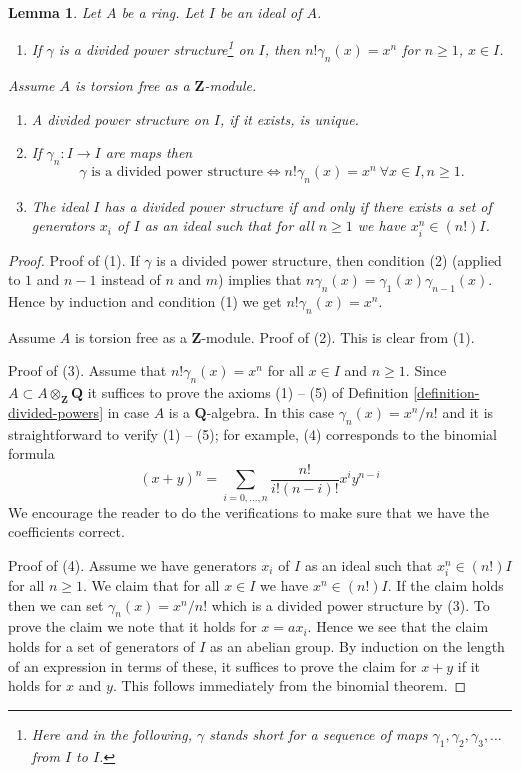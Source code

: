 \documentclass{stacks-project}
\theoremstyle{plain}
\newtheorem{lemma}[subsection]{Lemma}
\theoremstyle{definition}
\theoremstyle{remark}
\numberwithin{equation}{subsection}
\begin{document}
\begin{lemma}
\label{lemma-silly}
Let $A$ be a ring. Let $I$ be an ideal of $A$.
\begin{enumerate}
\item If $\gamma$ is a divided power structure\footnote{Here
and in the following, $\gamma$ stands short for a sequence
of maps $\gamma_1, \gamma_2, \gamma_3, \ldots$ from $I$ to $I$.}
on $I$, then
$n! \gamma_n(x) = x^n$ for $n \geq 1$, $x \in I$.
\end{enumerate}
Assume $A$ is torsion free as a $\mathbf{Z}$-module.
\begin{enumerate}
\item[(2)] A divided power structure on $I$, if it exists, is unique.
\item[(3)] If $\gamma_n : I \to I$ are maps then
$$
\gamma\text{ is a divided power structure}
\Leftrightarrow
n! \gamma_n(x) = x^n\ \forall x \in I, n \geq 1.
$$
\item[(4)] The ideal $I$ has a divided power structure
if and only if there exists
a set of generators $x_i$ of $I$ as an ideal such that
for all $n \geq 1$ we have $x_i^n \in (n!)I$.
\end{enumerate}
\end{lemma}

\begin{proof}
Proof of (1). If $\gamma$ is a divided power structure, then condition
(2) (applied to $1$ and $n-1$ instead of $n$ and $m$)
implies that $n \gamma_n(x) = \gamma_1(x)\gamma_{n - 1}(x)$. Hence
by induction and condition (1) we get $n! \gamma_n(x) = x^n$.

\medskip\noindent
Assume $A$ is torsion free as a $\mathbf{Z}$-module.
Proof of (2). This is clear from (1).

\medskip\noindent
Proof of (3). Assume that $n! \gamma_n(x) = x^n$ for all $x \in I$ and
$n \geq 1$. Since $A \subset A \otimes_{\mathbf{Z}} \mathbf{Q}$ it suffices
to prove the axioms (1) -- (5) of Definition
\ref{definition-divided-powers} in case $A$ is a $\mathbf{Q}$-algebra.
In this case $\gamma_n(x) = x^n/n!$ and it is straightforward
to verify (1) -- (5); for example, (4) corresponds to the binomial
formula
$$
(x + y)^n = \sum_{i = 0, \ldots, n} \frac{n!}{i!(n - i)!} x^iy^{n - i}
$$
We encourage the reader to do the verifications
to make sure that we have the coefficients correct.

\medskip\noindent
Proof of (4). Assume we have generators $x_i$ of $I$ as an ideal
such that $x_i^n \in (n!)I$ for all $n \geq 1$. We claim that
for all $x \in I$ we have $x^n \in (n!)I$. If the claim holds then
we can set $\gamma_n(x) = x^n/n!$ which is a divided power structure by (3).
To prove the claim we note that it holds for $x = ax_i$. Hence we see
that the claim holds for a set of generators of $I$ as an abelian group.
By induction on the length of an expression in terms of these, it suffices
to prove the claim for $x + y$ if it holds for $x$ and $y$. This
follows immediately from the binomial theorem.
\end{proof}
\end{document}
